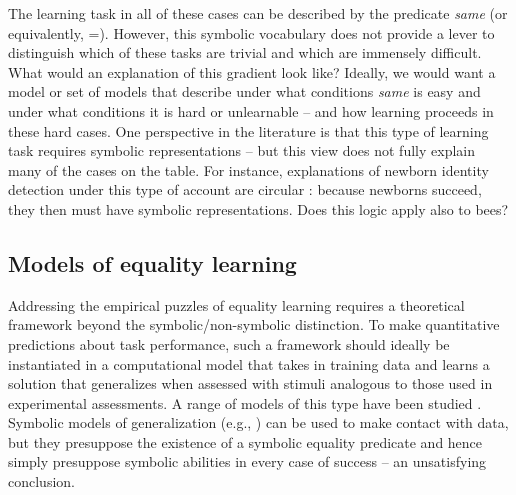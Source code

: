 \documentclass[9pt,twocolumn,twoside,lineno]{pnas-new}
\begin{document}
The learning task in all of these cases can be described by the predicate \emph{same} (or equivalently, =).  However, this symbolic vocabulary does not provide a lever to distinguish which of these tasks are trivial and which are immensely difficult. What would an explanation of this gradient look like? Ideally, we would want a model or set of models that describe under what conditions \emph{same} is easy and under what conditions it is hard or unlearnable -- and how learning proceeds in these hard cases. One perspective in the literature is that this type of learning task requires symbolic representations \citep{marcus:1999,Premack:1983} -- but this view does not fully explain many of the cases on the table. For instance, explanations of newborn identity detection under this type of account are circular \citep{gervain:2012}: because newborns succeed, they then must have symbolic representations. Does this logic apply also to bees?


\subsection{Models of equality learning}

Addressing the empirical puzzles of equality learning requires a theoretical framework beyond the symbolic/non-symbolic distinction. To make quantitative predictions about task performance, such a framework should ideally be instantiated in a computational model that takes in training data and learns a solution that generalizes when assessed with stimuli analogous to those used in experimental assessments. A range of models of this type have been studied \citep{alhama:2019}. Symbolic models of generalization (e.g., \citealt{frank:2011}) can be used to make contact with data, but they presuppose the existence of a symbolic equality predicate and hence simply presuppose symbolic abilities in every case of success -- an unsatisfying conclusion.
\end{document}
